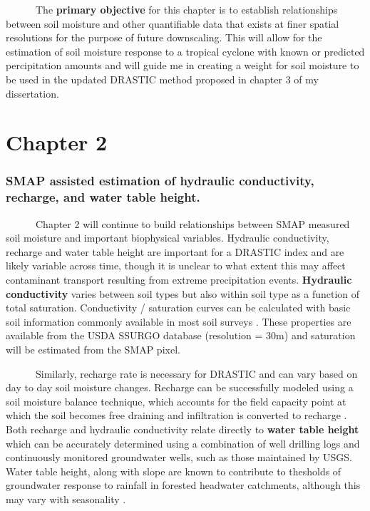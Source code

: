 \documentclass[
]{book}
\begin{document}
~~~~~~The \textbf{primary objective} for this chapter is to establish relationships between soil moisture and other quantifiable data that exists at finer spatial resolutions for the purpose of future downscaling. This will allow for the estimation of soil moisture response to a tropical cyclone with known or predicted percipitation amounts and will guide me in creating a weight for soil moisture to be used in the updated DRASTIC method proposed in chapter 3 of my dissertation.

\hypertarget{chapter2}{%
\chapter{Chapter 2}\label{chapter2}}

\hypertarget{smap-assisted-estimation-of-hydraulic-conductivity-recharge-and-water-table-height.}{%
\subsection{SMAP assisted estimation of hydraulic conductivity, recharge, and water table height.}\label{smap-assisted-estimation-of-hydraulic-conductivity-recharge-and-water-table-height.}}

~~~~~~Chapter 2 will continue to build relationships between SMAP measured soil moisture and important biophysical variables. Hydraulic conductivity, recharge and water table height are important for a DRASTIC index and are likely variable across time, though it is unclear to what extent this may affect contaminant transport resulting from extreme precipitation events. \textbf{Hydraulic conductivity} varies between soil types but also within soil type as a function of total saturation. Conductivity / saturation curves can be calculated with basic soil information commonly available in most soil surveys \citep{vereecken1990estimating}. These properties are available from the USDA SSURGO database (resolution = 30m) and saturation will be estimated from the SMAP pixel.

~~~~~~Similarly, recharge rate is necessary for DRASTIC and can vary based on day to day soil moisture changes. Recharge can be successfully modeled using a soil moisture balance technique, which accounts for the field capacity point at which the soil becomes free draining and infiltration is converted to recharge \citep{rushton2006improved}. Both recharge and hydraulic conductivity relate directly to \textbf{water table height} which can be accurately determined using a combination of well drilling logs and continuously monitored groundwater wells, such as those maintained by USGS. Water table height, along with slope are known to contribute to thesholds of groundwater response to rainfall in forested headwater catchments, although this may vary with seasonality \citep{singh2018relative}.
\end{document}
